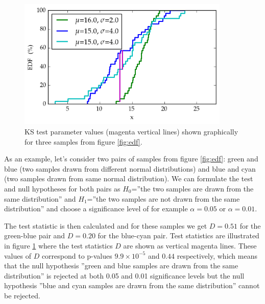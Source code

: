\documentclass[english, oneside]{HYgradu}
\begin{document}
\begin{figure}
   \centering
   \includegraphics[width=0.9\textwidth]{kuvat/kstest.png}
   \caption{KS test parameter values (magenta vertical lines) shown graphically for three samples from figure \ref{fig:edf}.}
   \label{fig:ks} 
\end{figure}

As an example, let's consider two pairs of samples from figure \ref{fig:edf}: green and blue (two samples drawn from different normal distributions) and blue and cyan (two samples drawn from same normal distribution). We can formulate the test and null hypotheses for both pairs as $H_0$=''the two samples are drawn from the same distribution'' and $H_1$=''the two samples are not drawn from the same distribution'' and choose a significance level of for example $\alpha=0.05$ or $\alpha=0.01$.

\reversemarginpar
{}
The test statistic is then calculated and for these samples we get $D=0.51$ for the green-blue pair and $D=0.20$ for the blue-cyan pair. Test statistics are illustrated in figure \ref{fig:ks} where the test statistics $D$ are shown as vertical magenta lines. These values of $D$ correspond to p-values $9.9\times 10^{-5}$ and $0.44$ respectively, which means that the null hypothesis ''green and blue samples are drawn from the same distribution'' is rejected at both 0.05 and 0.01 significance levels but the null hypothesis ''blue and cyan samples are drawn from the same distribution'' cannot be rejected.
\end{document}
